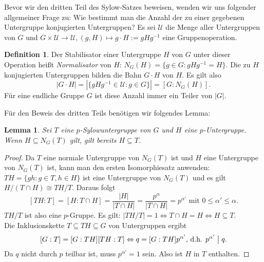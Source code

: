 \documentclass[12pt]{scrartcl} %
\newcommand{\divides}{\mathrel{\bigm|}}
\newtheorem{lemma}[thm]{Lemma}
\theoremstyle{definition}
\newtheorem*{defn}{Definition}
\theoremstyle{remark}
\newcommand{\defi}{\emph}
\begin{document}
Bevor wir den dritten Teil des Sylow-Satzes beweisen, wenden wir uns folgender allgemeiner Frage zu:
Wie bestimmt man die Anzahl der zu einer gegebenen Untergruppe konjugierten Untergruppen?
Es sei $\mathcal{U}$ die Menge aller Untergruppen von \(G\) und $G \times \mathcal{U} \rightarrow \mathcal{U}, (g , H) \mapsto g \cdot H := gHg^{-1}$ eine Gruppenoperation.

\begin{defn}
	Der Stabilisator einer Untergruppe $H$ von $G$ unter dieser Operation heißt \defi{Normalisator} von $H$: $N_G(H) = \{ g \in G: gHg^{-1} = H \}$.
	Die zu $H$ konjugierten Untergruppen bilden die Bahn $G \cdot H$ von $H$.
	Es gilt also $$|G \cdot H| = | \{ gHg^{-1} \in \mathcal{U} : g \in G \} | = [G:N_G(H)].$$
	Für eine endliche Gruppe $G$ ist diese Anzahl immer ein Teiler von $|G|$.
\end{defn}

Für den Beweis des dritten Teils benötigen wir folgendes Lemma:

\begin{lemma}\label{lem:Sylow}
	Sei $T$ eine $p$-Sylowuntergruppe von $G$ und $H$ eine $p$-Untergruppe.
	Wenn $H \subseteq N_G(T)$ gilt, gilt bereits $H \subseteq T$.
\end{lemma}

\begin{proof}
	Da $T$ eine normale Untergruppe von $N_G(T)$ ist und $H$ eine Untergruppe von $N_G(T)$ ist, kann man den ersten Isomorphiesatz anwenden: $TH = \{ gh : g \in T, h \in H \}$ ist eine Untergruppe von $N_G(T)$ und es gilt $H/(T \cap H) \cong TH/T$. Daraus folgt
	$$ [TH : T] = [H : T \cap H] = \frac{|H|}{|T \cap H|} = \frac{p^{\alpha}}{|T \cap H|} = p^{\alpha '} \text{ mit } 0 \leq \alpha ' \leq \alpha.$$
	$TH/T$ ist also eine $p$-Gruppe. Es gilt: $|TH/T| = 1 \Leftrightarrow T \cap H = H \Leftrightarrow H \subseteq T$. \\
	Die Inklusionskette $T \subseteq TH \subseteq G$ von Untergruppen ergibt
	$$[G:T] = [G:TH][TH:T] \Leftrightarrow q = [G:TH]p^{\alpha '} \text{, d.h. } p^{\alpha '} \divides q.$$
	Da $q$ nicht durch $p$ teilbar ist, muss $p^{\alpha '} = 1$ sein. Also ist $H$ in $T$ enthalten.
\end{proof}
\end{document}
